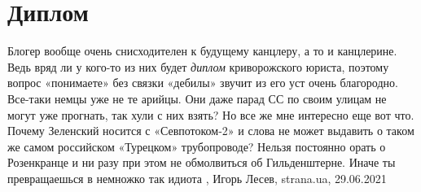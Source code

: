  
 
 
 
 
\chapter{Диплом}

Блогер вообще очень снисходителен к будущему канцлеру, а то и канцлерине. Ведь
вряд ли у кого-то из них будет \emph{диплом} криворожского юриста, поэтому вопрос
«понимаете» без связки «дебилы» звучит из его уст очень благородно. Все-таки
немцы уже не те арийцы. Они даже парад СС по своим улицам не могут уже
прогнать, так хули с них взять? Но все же мне интересно еще вот что. Почему
Зеленский носится с «Севпотоком-2» и слова не может выдавить о таком же самом
российском «Турецком» трубопроводе? Нельзя постоянно орать о Розенкранце и ни
разу при этом не обмолвиться об Гильденштерне. Иначе ты превращаешься в
немножко так идиота
, 
Игорь Лесев, strana.ua, 29.06.2021

